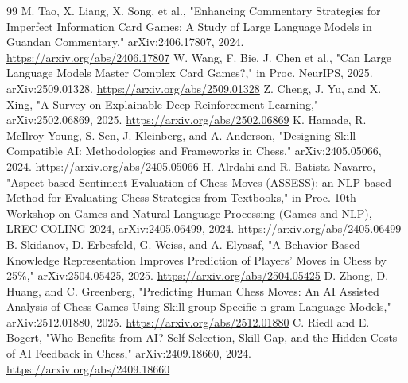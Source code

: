 \documentclass[conference]{IEEEtran}
\begin{document}
\begin{thebibliography}{99}
 M. Tao, X. Liang, X. Song, et al., "Enhancing Commentary Strategies for Imperfect Information Card Games: A Study of Large Language Models in Guandan Commentary," arXiv:2406.17807, 2024. \url{https://arxiv.org/abs/2406.17807}
 W. Wang, F. Bie, J. Chen et al., "Can Large Language Models Master Complex Card Games?," in Proc. NeurIPS, 2025. arXiv:2509.01328. \url{https://arxiv.org/abs/2509.01328}
 Z. Cheng, J. Yu, and X. Xing, "A Survey on Explainable Deep Reinforcement Learning," arXiv:2502.06869, 2025. \url{https://arxiv.org/abs/2502.06869}
 K. Hamade, R. McIlroy-Young, S. Sen, J. Kleinberg, and A. Anderson, "Designing Skill-Compatible AI: Methodologies and Frameworks in Chess," arXiv:2405.05066, 2024. \url{https://arxiv.org/abs/2405.05066}
 H. Alrdahi and R. Batista-Navarro, "Aspect-based Sentiment Evaluation of Chess Moves (ASSESS): an NLP-based Method for Evaluating Chess Strategies from Textbooks," in Proc. 10th Workshop on Games and Natural Language Processing (Games and NLP), LREC-COLING 2024, arXiv:2405.06499, 2024. \url{https://arxiv.org/abs/2405.06499}
 B. Skidanov, D. Erbesfeld, G. Weiss, and A. Elyasaf, "A Behavior-Based Knowledge Representation Improves Prediction of Players' Moves in Chess by 25\%," arXiv:2504.05425, 2025. \url{https://arxiv.org/abs/2504.05425}
 D. Zhong, D. Huang, and C. Greenberg, "Predicting Human Chess Moves: An AI Assisted Analysis of Chess Games Using Skill-group Specific n-gram Language Models," arXiv:2512.01880, 2025. \url{https://arxiv.org/abs/2512.01880}
 C. Riedl and E. Bogert, "Who Benefits from AI? Self-Selection, Skill Gap, and the Hidden Costs of AI Feedback in Chess," arXiv:2409.18660, 2024. \url{https://arxiv.org/abs/2409.18660}
\end{thebibliography}
\end{document}
